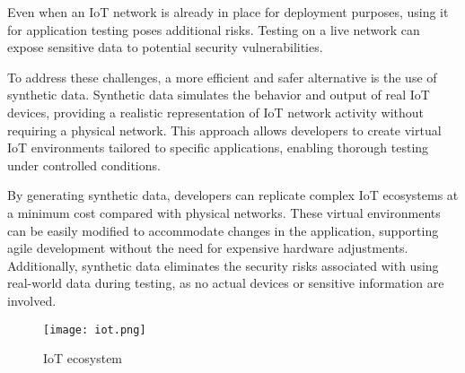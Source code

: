 Even when an IoT network is already in place for deployment purposes, using it for application testing poses additional risks. Testing on a live network can expose sensitive data to potential security vulnerabilities.

To address these challenges, a more efficient and safer alternative is the use of synthetic data. Synthetic data simulates the behavior and output of real IoT devices, providing a realistic representation of IoT network activity without requiring a physical network. This approach allows developers to create virtual IoT environments tailored to specific applications, enabling thorough testing under controlled conditions.

By generating synthetic data, developers can replicate complex IoT ecosystems at a minimum cost compared with physical networks. These virtual environments can be easily modified to accommodate changes in the application, supporting agile development without the need for expensive hardware adjustments. Additionally, synthetic data eliminates the security risks associated with using real-world data during testing, as no actual devices or sensitive information are involved.



\begin{figure}[!h]
    \graphicspath{ {./diagrams/} }
    \texttt{[image: iot.png]}
    \centering
    \caption{IoT ecosystem}
    \label{fig:iot_eco}
\end{figure}